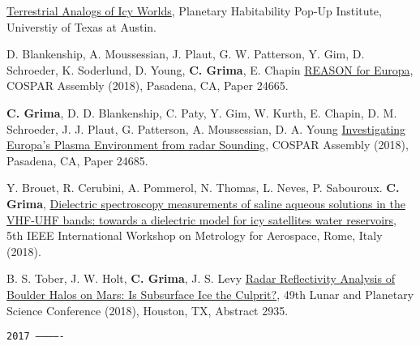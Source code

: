 \begin{etaremune}
  \href{https://ig.utexas.edu/events/planetary-habitability/program-and-registration/week-3-habitability/}{Terrestrial
  Analogs of Icy Worlds}, Planetary Habitability Pop-Up Institute,
  Universtiy of Texas at Austin.
\item
  D. Blankenship, A. Moussessian, J. Plaut, G. W. Patterson, Y. Gim, D.
  Schroeder, K. Soderlund, D. Young, \textbf{C. Grima}, E. Chapin
  \href{}{REASON for Europa}, COSPAR Assembly (2018), Pasadena, CA,
  Paper 24665.
\item
  \textbf{C. Grima}, D. D. Blankenship, C. Paty, Y. Gim, W. Kurth, E.
  Chapin, D. M. Schroeder, J. J. Plaut, G. Patterson, A. Moussessian, D.
  A. Young \href{}{Investigating Europa's Plasma Environment from radar
  Sounding}, COSPAR Assembly (2018), Pasadena, CA, Paper 24685.
\item
  Y. Brouet, R. Cerubini, A. Pommerol, N. Thomas, L. Neves, P.
  Sabouroux. \textbf{C. Grima},
  \href{http://www.metroaerospace.org/files/MAS2018_Final.pdf}{Dielectric
  spectroscopy measurements of saline aqueous solutions in the VHF-UHF
  bands: towards a dielectric model for icy satellites water
  reservoirs}, 5th IEEE International Workshop on Metrology for
  Aerospace, Rome, Italy (2018).
\item
  B. S. Tober, J. W. Holt, \textbf{C. Grima}, J. S. Levy
  \href{https://www.hou.usra.edu/meetings/lpsc2018/pdf/2935.pdf}{Radar
  Reflectivity Analysis of Boulder Halos on Mars: Is Subsurface Ice the
  Culprit?}, 49th Lunar and Planetary Science Conference (2018),
  Houston, TX, Abstract 2935.

\hspace{-2em}\texttt{2017 -------------}


\end{etaremune}
